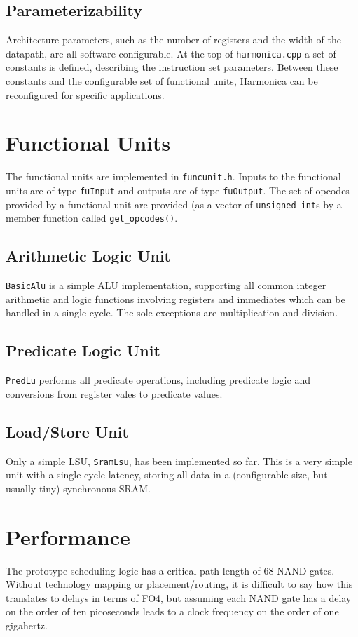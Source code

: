 \documentclass[10pt,twocolumn]{article}
\begin{document}
\subsection{Parameterizability}
Architecture parameters, such as the number of registers and the width of the datapath, are all software configurable.
At the top of \texttt{harmonica.cpp} a set of constants is defined, describing the instruction set parameters.
Between these constants and the configurable set of functional units, Harmonica can be reconfigured for specific applications.

\section{Functional Units}

The functional units are implemented in \texttt{funcunit.h}.
Inputs to the functional units are of type \texttt{fuInput} and outputs are of type \texttt{fuOutput}.
The set of opcodes provided by a functional unit are provided (as a vector of \texttt{unsigned int}s by a member function called \texttt{get\_opcodes()}.

\subsection{Arithmetic Logic Unit}

\texttt{BasicAlu} is a simple ALU implementation, supporting all common integer arithmetic and logic functions involving registers and immediates which can be handled in a single cycle.
The sole exceptions are multiplication and division.

\subsection{Predicate Logic Unit}

\texttt{PredLu} performs all predicate operations, including predicate logic and conversions from register vales to predicate values.

\subsection{Load/Store Unit}

Only a simple LSU, \texttt{SramLsu}, has been implemented so far.
This is a very simple unit with a single cycle latency, storing all data in a (configurable size, but usually tiny) synchronous SRAM.

\section{Performance}
The prototype scheduling logic has a critical path length of 68 NAND gates.
Without technology mapping or placement/routing, it is difficult to say how this translates to delays in terms of FO4, but assuming each NAND gate has a delay on the order of ten picoseconds leads to a clock frequency on the order of one gigahertz.
\end{document}
